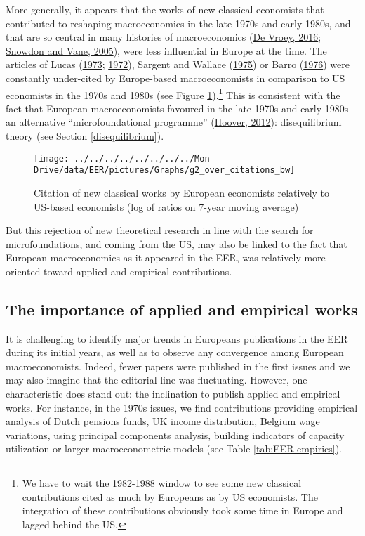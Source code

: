 \documentclass[
  12pt,
  onecolumn]{article}
\begin{document}
More generally, it appears that the works of new classical economists
that contributed to reshaping macroeconomics in the late 1970s and early
1980s, and that are so central in many histories of macroeconomics
(\protect\hyperlink{ref-devroey2016}{De Vroey, 2016};
\protect\hyperlink{ref-snowdon2005}{Snowdon and Vane, 2005}), were less
influential in Europe at the time. The articles of Lucas
(\protect\hyperlink{ref-lucas1973}{1973};
\protect\hyperlink{ref-lucas1972}{1972}), Sargent and Wallace
(\protect\hyperlink{ref-sargent1975}{1975}) or Barro
(\protect\hyperlink{ref-barro1976}{1976}) were constantly under-cited by
Europe-based macroeconomists in comparison to US economists in the 1970s
and 1980s (see Figure \ref{fig:plot-new-classical}).\footnote{We have to
  wait the 1982-1988 window to see some new classical contributions
  cited as much by Europeans as by US economists. The integration of
  these contributions obviously took some time in Europe and lagged
  behind the US.} This is consistent with the fact that European
macroeconomists favoured in the late 1970s and early 1980s an
alternative ``microfoundational programme''
(\protect\hyperlink{ref-hoover2012}{Hoover, 2012}): disequilibrium
theory (see Section \ref{disequilibrium}).

\begin{figure}[h]

{\centering \texttt{[image: ../../../../../../../../Mon Drive/data/EER/pictures/Graphs/g2\_over\_citations\_bw]} 

}

\caption{Citation of new classical works by European economists relatively to US-based economists (log of ratios on 7-year moving average)}\label{fig:plot-new-classical}
\end{figure}

But this rejection of new theoretical research in line with the search
for microfoundations, and coming from the US, may also be linked to the
fact that European macroeconomics as it appeared in the EER, was
relatively more oriented toward applied and empirical contributions.

\hypertarget{the-importance-of-applied-and-empirical-works}{%
\subsection{The importance of applied and empirical
works}\label{the-importance-of-applied-and-empirical-works}}

It is challenging to identify major trends in Europeans publications in
the EER during its initial years, as well as to observe any convergence
among European macroeconomists. Indeed, fewer papers were published in
the first issues and we may also imagine that the editorial line was
fluctuating. However, one characteristic does stand out: the inclination
to publish applied and empirical works. For instance, in the 1970s
issues, we find contributions providing empirical analysis of Dutch
pensions funds, UK income distribution, Belgium wage variations, using
principal components analysis, building indicators of capacity
utilization or larger macroeconometric models (see Table
\ref{tab:EER-empirics}).
\end{document}
